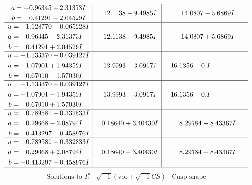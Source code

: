 \documentclass[1p]{elsarticle_modified}
\theoremstyle{definition}
\newcommand{\I}{\sqrt{-1}}
\begin{document}
$$\begin{array}{c|c|c}
\begin{aligned}
a &= -0.96345 + 2.31373 I \\
b &= \phantom{-}0.41291 - 2.04529 I\end{aligned}
 & \phantom{-}12.1138 + 9.4985 I & \phantom{-}14.0807 - 5.6869 I \\ \hline\begin{aligned}
u &= \phantom{-}1.128770 - 0.065228 I \\
a &= -0.96345 - 2.31373 I \\
b &= \phantom{-}0.41291 + 2.04529 I\end{aligned}
 & \phantom{-}12.1138 - 9.4985 I & \phantom{-}14.0807 + 5.6869 I \\ \hline\begin{aligned}
u &= -1.133370 + 0.039127 I \\
a &= -1.07901 + 1.94352 I \\
b &= \phantom{-}0.67010 - 1.57030 I\end{aligned}
 & \phantom{-}13.9993 - 3.0917 I & \phantom{-}16.1356 + 0. I\phantom{ +0.000000I} \\ \hline\begin{aligned}
u &= -1.133370 - 0.039127 I \\
a &= -1.07901 - 1.94352 I \\
b &= \phantom{-}0.67010 + 1.57030 I\end{aligned}
 & \phantom{-}13.9993 + 3.0917 I & \phantom{-}16.1356 + 0. I\phantom{ +0.000000I} \\ \hline\begin{aligned}
u &= \phantom{-}0.789581 + 0.332833 I \\
a &= \phantom{-}0.29668 - 2.08794 I \\
b &= -0.413297 + 0.458976 I\end{aligned}
 & \phantom{-}0.18640 + 3.40430 I & \phantom{-}8.29784 - 8.43367 I \\ \hline\begin{aligned}
u &= \phantom{-}0.789581 - 0.332833 I \\
a &= \phantom{-}0.29668 + 2.08794 I \\
b &= -0.413297 - 0.458976 I\end{aligned}
 & \phantom{-}0.18640 - 3.40430 I & \phantom{-}8.29784 + 8.43367 I\\
 \hline 
 \end{array}$$\newpage$$\begin{array}{c|c|c}  
\text{Solutions to }I^u_{1}& \I (\text{vol} + \sqrt{-1}CS) & \text{Cusp shape}\\
 \hline 
\begin{aligned}

\end{aligned}
\end{array}$$
\end{document}
